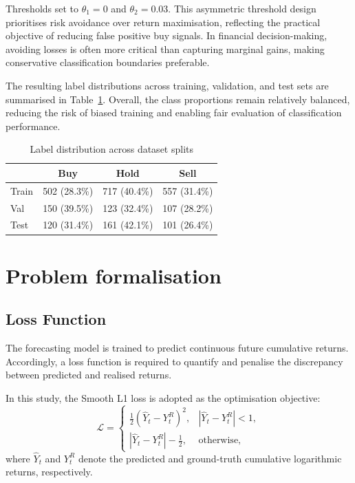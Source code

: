 \documentclass[10pt]{article} %
\begin{document}
Thresholds set to $\theta_1 = 0$ and $\theta_2 = 0.03$. This asymmetric threshold design prioritises risk avoidance over return maximisation, reflecting the practical objective of reducing false positive buy signals. In financial decision-making, avoiding losses is often more critical than capturing marginal gains, making conservative classification boundaries preferable.


The resulting label distributions across training, validation, and test sets are summarised in Table~\ref{tab:label_distribution}. Overall, the class proportions remain relatively balanced, reducing the risk of biased training and enabling fair evaluation of classification performance.


\begin{table}[h]
\centering
\caption{Label distribution across dataset splits}
\label{tab:label_distribution}
\begin{tabular}{l c c c}
\hline
 & Buy & Hold & Sell \\
\hline
Train & 502 (28.3\%) & 717 (40.4\%) & 557 (31.4\%) \\
Val   & 150 (39.5\%) & 123 (32.4\%) & 107 (28.2\%) \\
Test  & 120 (31.4\%) & 161 (42.1\%) & 101 (26.4\%) \\
\hline
\end{tabular}
\end{table}




\section{Problem formalisation}
\subsection{Loss Function}

The forecasting model is trained to predict continuous future cumulative returns. 
Accordingly, a loss function is required to quantify and penalise the discrepancy between predicted and realised returns.

In this study, the Smooth L1 loss is adopted as the optimisation objective:
\begin{equation}
\mathcal{L} =
\begin{cases}
\frac{1}{2}(\hat{Y}_t - Y_{t}^{R})^2, & |\hat{Y}_t - Y_{t}^{R}| < 1, \\
|\hat{Y}_t - Y_{t}^{R}| - \frac{1}{2}, & \text{otherwise},
\end{cases}
\end{equation}
where $\hat{Y}_t$ and $Y_{t}^{R}$ denote the predicted and ground-truth cumulative logarithmic returns, respectively.
\end{document}
